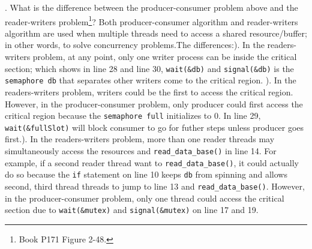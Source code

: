 \documentclass[12pt]{article}
\begin{document}
. What is the difference between the producer-consumer problem above and the reader-writers problem\footnote{Book P171 Figure 2-48.}? \hfil \break
\break
Both producer-consumer algorithm and reader-writers algorithm are used when multiple threads need to access a shared resource/buffer; in other words, to solve concurrency problems.\hfil \break The differences:\hfil{}). In the readers-writers problem, at any point, only one writer process can be inside the critical section; which shows in line 28 and line 30, \texttt{wait(\&db)} and \texttt{signal(\&db)} is the \texttt{semaphore db} that separates other writers come to the critical region. \hfill {}). In the readers-writers problem, writers could be the first to access the critical region. However, in the producer-consumer problem, only producer could first access the critical region because the \texttt{semaphore full} initializes to 0. In line 29, \texttt{wait(\&fullSlot)} will block consumer to go for futher steps unless producer goes first.\hfill {}). In the readers-writers problem, more than one reader threads may simultaneously access the resources and \texttt{read\_data\_base()}  in line 14. For example, if a second reader thread want to \texttt{read\_data\_base()}, it could actually do so because the \texttt{if} statement on line 10 keeps \texttt{db} from spinning and allows second, third thread threads to jump to line 13 and \texttt{read\_data\_base()}. However, in the producer-consumer problem, only one thread could access the critical section due to \texttt{wait(\&mutex)} and \texttt{signal(\&mutex)} on line 17 and 19. 
\end{document}
